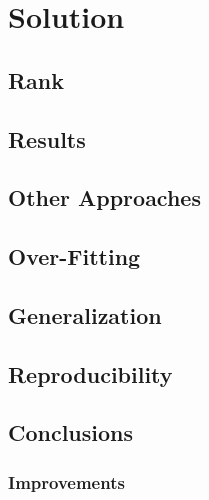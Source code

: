 \chapter{Solution}
\label{chap:Solution}

\section{Rank}
\label{sec:Rank}
\section{Results}
\label{sec:Results}
\section{Other Approaches}
\label{sec:Other Approaches}
\section{Over-Fitting}
\label{sec:Over-Fitting}
\section{Generalization}
\label{sec:Generalization}
\section{Reproducibility}
\label{sec:Reproducibility}
\section{Conclusions}
\label{sec:Conclusions}
\subsection{Improvements}
\label{sub:Improvements}
